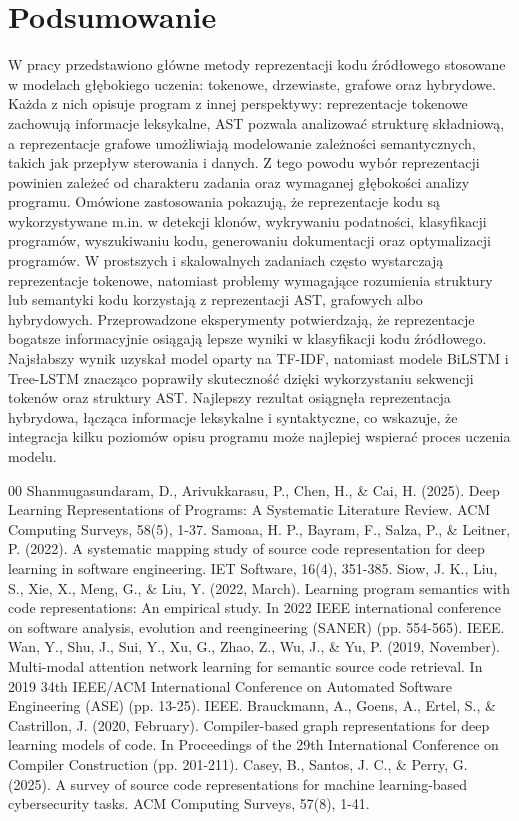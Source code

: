 \documentclass[conference]{IEEEtran}
\begin{document}
\section{Podsumowanie}
W pracy przedstawiono główne metody reprezentacji kodu źródłowego stosowane w modelach głębokiego uczenia: tokenowe, drzewiaste, grafowe oraz hybrydowe. Każda z nich opisuje program z innej perspektywy: reprezentacje tokenowe zachowują informacje leksykalne, AST pozwala analizować strukturę składniową, a reprezentacje grafowe umożliwiają modelowanie zależności semantycznych, takich jak przepływ sterowania i danych. Z tego powodu wybór reprezentacji powinien zależeć od charakteru zadania oraz wymaganej głębokości analizy programu.
Omówione zastosowania pokazują, że reprezentacje kodu są wykorzystywane m.in. w detekcji klonów, wykrywaniu podatności, klasyfikacji programów, wyszukiwaniu kodu, generowaniu dokumentacji oraz optymalizacji programów. W prostszych i skalowalnych zadaniach często wystarczają reprezentacje tokenowe, natomiast problemy wymagające rozumienia struktury lub semantyki kodu korzystają z reprezentacji AST, grafowych albo hybrydowych.
Przeprowadzone eksperymenty potwierdzają, że reprezentacje bogatsze informacyjnie osiągają lepsze wyniki w klasyfikacji kodu źródłowego. Najsłabszy wynik uzyskał model oparty na TF-IDF, natomiast modele BiLSTM i Tree-LSTM znacząco poprawiły skuteczność dzięki wykorzystaniu sekwencji tokenów oraz struktury AST. Najlepszy rezultat osiągnęła reprezentacja hybrydowa, łącząca informacje leksykalne i syntaktyczne, co wskazuje, że integracja kilku poziomów opisu programu może najlepiej wspierać proces uczenia modelu.

\renewcommand{\refname}{Bibliografia}
\begin{thebibliography}{00}
 Shanmugasundaram, D., Arivukkarasu, P., Chen, H., \& Cai, H. (2025). Deep Learning Representations of Programs: A Systematic Literature Review. ACM Computing Surveys, 58(5), 1-37.
 Samoaa, H. P., Bayram, F., Salza, P., \& Leitner, P. (2022). A systematic mapping study of source code representation for deep learning in software engineering. IET Software, 16(4), 351-385.
 Siow, J. K., Liu, S., Xie, X., Meng, G., \& Liu, Y. (2022, March). Learning program semantics with code representations: An empirical study. In 2022 IEEE international conference on software analysis, evolution and reengineering (SANER) (pp. 554-565). IEEE.
 Wan, Y., Shu, J., Sui, Y., Xu, G., Zhao, Z., Wu, J., \& Yu, P. (2019, November). Multi-modal attention network learning for semantic source code retrieval. In 2019 34th IEEE/ACM International Conference on Automated Software Engineering (ASE) (pp. 13-25). IEEE.
 Brauckmann, A., Goens, A., Ertel, S., \& Castrillon, J. (2020, February). Compiler-based graph representations for deep learning models of code. In Proceedings of the 29th International Conference on Compiler Construction (pp. 201-211).
 Casey, B., Santos, J. C., \& Perry, G. (2025). A survey of source code representations for machine learning-based cybersecurity tasks. ACM Computing Surveys, 57(8), 1-41.
\end{thebibliography}
\end{document}
